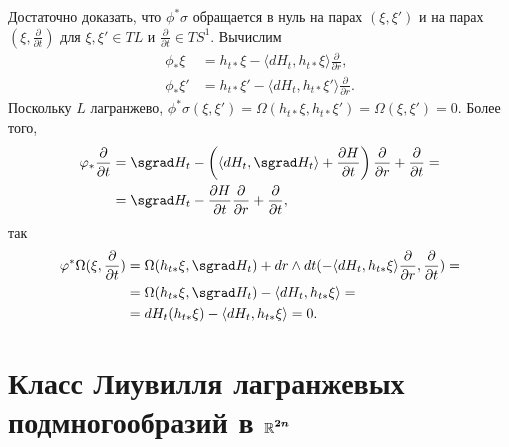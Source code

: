 Достаточно доказать, что $\phi^\ast \sigma$ обращается в нуль на парах $(\xi, \xi')$ и на парах  $(\xi, \tfrac{\partial}{\partial t})$ для $\xi, \xi' \in T L$ и $\tfrac{\partial}{\partial t} \in T S^1$.
Вычислим 
\begin{align*}
\phi_\ast \xi
&= h_{t\ast} \xi - \langle dH_t, h_{t\ast} \xi\rangle
\frac{\partial}{\partial r},
\\
\phi_\ast \xi'
&= h_{t\ast} \xi' - \langle dH_t, h_{t\ast} \xi'\rangle
\frac{\partial}{\partial r}.
\end{align*}
Поскольку $L$ лагранжево, $\phi^\ast \sigma (\xi, \xi') = \Omega (h_{t\ast} \xi, h_{t\ast} \xi') = \Omega (\xi, \xi') = 0$.
Более того,
\begin{align*}
\phi_\ast\frac{\partial}{\partial t}
&= \sgrad H_t - 
\left( \langle dH_t, \sgrad H_t \rangle +\frac{\partial H}{\partial t}\right) \frac{\partial}{\partial r} +\frac{\partial}{\partial t}=
\\
&=\sgrad H_t - \frac{\partial H}{\partial t}\frac{\partial}{\partial r} +\frac{\partial}{\partial t},
\end{align*}
так 
\begin{align*}
\phi^\ast \Omega (\xi, \frac{\partial}{\partial t})
&= \Omega (h_{t\ast} \xi, \sgrad H_t) + dr \wedge dt (-\langle dH_t, h_{t\ast} \xi\rangle \frac{\partial}{\partial r},\frac{\partial}{\partial t}) =
\\
&=\Omega (h_{t\ast} \xi, \sgrad H_t) - \langle dH_t, h_{t\ast} \xi\rangle =
\\
&=dH_t (h_{t\ast} \xi) - \langle dH_t, h_{t\ast} \xi\rangle = 0.
\end{align*}
\qeds

\section[\texorpdfstring{Класс Лиувилля лагранжевых подмногообразий в $\RR^{2n}$}{Класс Лиувилля лагранжевых подмногообразий в ℝ²ⁿ}]{Класс Лиувилля лагранжевых подмногообразий в $\bm{\mathbb{R}^{2n}}$}

